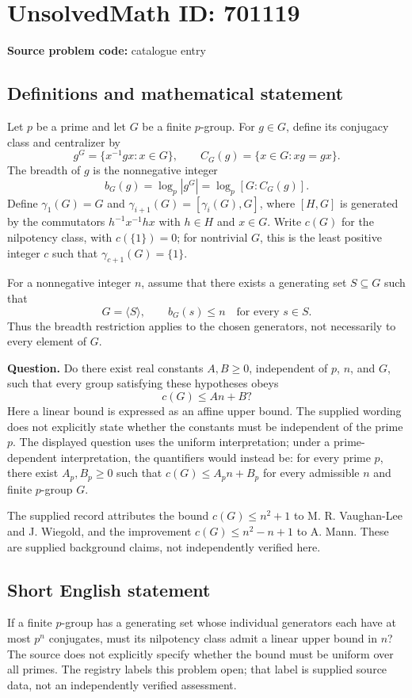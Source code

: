 \documentclass[11pt]{article}
\begin{document}
\section*{UnsolvedMath ID: 701119}
\textbf{Source problem code:} catalogue entry
\subsection{Definitions and mathematical statement}
Let \(p\) be a prime and let \(G\) be a finite \(p\)-group. For \(g\in G\), define its conjugacy class and centralizer by
\[
g^G=\{x^{-1}gx:x\in G\},\qquad C_G(g)=\{x\in G:xg=gx\}.
\]
The breadth of \(g\) is the nonnegative integer
\[
b_G(g)=\log_p|g^G|=\log_p[G:C_G(g)].
\]
Define \(\gamma_1(G)=G\) and \(\gamma_{i+1}(G)=[\gamma_i(G),G]\), where \([H,G]\) is generated by the commutators \(h^{-1}x^{-1}hx\) with \(h\in H\) and \(x\in G\). Write \(c(G)\) for the nilpotency class, with \(c(\{1\})=0\); for nontrivial \(G\), this is the least positive integer \(c\) such that \(\gamma_{c+1}(G)=\{1\}\).

For a nonnegative integer \(n\), assume that there exists a generating set \(S\subseteq G\) such that
\[
G=\langle S\rangle,\qquad b_G(s)\le n\quad\text{for every }s\in S.
\]
Thus the breadth restriction applies to the chosen generators, not necessarily to every element of \(G\).

\textbf{Question.} Do there exist real constants \(A,B\ge0\), independent of \(p\), \(n\), and \(G\), such that every group satisfying these hypotheses obeys
\[
c(G)\le An+B?
\]
Here a linear bound is expressed as an affine upper bound. The supplied wording does not explicitly state whether the constants must be independent of the prime \(p\). The displayed question uses the uniform interpretation; under a prime-dependent interpretation, the quantifiers would instead be: for every prime \(p\), there exist \(A_p,B_p\ge0\) such that \(c(G)\le A_pn+B_p\) for every admissible \(n\) and finite \(p\)-group \(G\).

The supplied record attributes the bound \(c(G)\le n^2+1\) to M. R. Vaughan-Lee and J. Wiegold, and the improvement \(c(G)\le n^2-n+1\) to A. Mann. These are supplied background claims, not independently verified here.
\subsection{Short English statement}
If a finite \(p\)-group has a generating set whose individual generators each have at most \(p^n\) conjugates, must its nilpotency class admit a linear upper bound in \(n\)? The source does not explicitly specify whether the bound must be uniform over all primes. The registry labels this problem open; that label is supplied source data, not an independently verified assessment.
\end{document}

